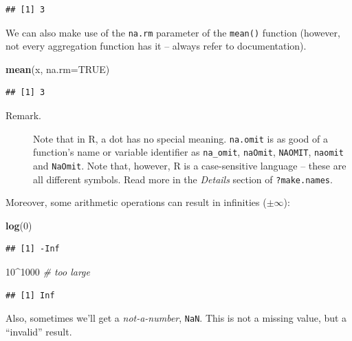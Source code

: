 \documentclass[10pt,b5paper,krantz1]{krantz}
\newenvironment{Shaded}{\begin{snugshade}}{\end{snugshade}}
\newcommand{\CommentTok}[1]{\textcolor[rgb]{0.37,0.37,0.37}{\textit{#1}}}
\newcommand{\DataTypeTok}[1]{\textcolor[rgb]{0.27,0.27,0.27}{#1}}
\newcommand{\DecValTok}[1]{\textcolor[rgb]{0.06,0.06,0.06}{#1}}
\newcommand{\KeywordTok}[1]{\textcolor[rgb]{0.27,0.27,0.27}{\textbf{#1}}}
\newcommand{\NormalTok}[1]{#1}
\newcommand{\OperatorTok}[1]{\textcolor[rgb]{0.43,0.43,0.43}{\textbf{#1}}}
\newcommand{\OtherTok}[1]{\textcolor[rgb]{0.37,0.37,0.37}{#1}}
\begin{document}
\begin{verbatim}
## [1] 3
\end{verbatim}

We can also make use of the \texttt{na.rm} parameter of the \texttt{mean()} function
(however, not every aggregation function has it -- always refer to documentation).

\begin{Shaded}
\begin{Highlighting}[]
\KeywordTok{mean}\NormalTok{(x, }\DataTypeTok{na.rm=}\OtherTok{TRUE}\NormalTok{)}
\end{Highlighting}
\end{Shaded}

\begin{verbatim}
## [1] 3
\end{verbatim}

\begin{description}
\item[Remark.]
Note that in R, a dot has no special meaning.
\texttt{na.omit} is as good of a function's name or variable identifier
as \texttt{na\_omit}, \texttt{naOmit}, \texttt{NAOMIT}, \texttt{naomit} and \texttt{NaOmit}.
Note that, however, R is a case-sensitive language -- these are all different
symbols.
Read more in the \emph{Details} section of \texttt{?make.names}.
\end{description}

Moreover, some arithmetic operations can result in infinities (\(\pm \infty\)):

\begin{Shaded}
\begin{Highlighting}[]
\KeywordTok{log}\NormalTok{(}\DecValTok{0}\NormalTok{)}
\end{Highlighting}
\end{Shaded}

\begin{verbatim}
## [1] -Inf
\end{verbatim}

\begin{Shaded}
\begin{Highlighting}[]
\DecValTok{10}\OperatorTok{^}\DecValTok{1000} \CommentTok{# too large}
\end{Highlighting}
\end{Shaded}

\begin{verbatim}
## [1] Inf
\end{verbatim}

Also, sometimes we'll get a \emph{not-a-number}, \texttt{NaN}. This is not a missing value,
but a ``invalid'' result.
\end{document}
